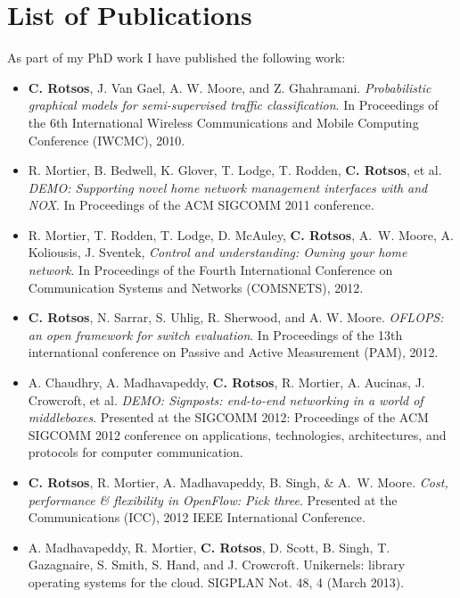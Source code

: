 
\chapter*{List of Publications} \label{sec:intro:pubs}
As part of my PhD work I have published the following work:
\begin{itemize}
  \item \textbf{C. Rotsos}, J. Van Gael, A. W. Moore, and Z.  Ghahramani.
        \textit{Probabilistic graphical models for semi-supervised traffic
          classification}. In Proceedings of the 6th International Wireless
        Communications and Mobile Computing Conference (IWCMC), 2010.

  \item R. Mortier, B. Bedwell, K. Glover, T. Lodge, T. Rodden, \textbf{C.
        Rotsos}, et al. \textit{DEMO: Supporting novel home network management
        interfaces with \of and NOX}. In Proceedings of the ACM SIGCOMM
      2011 conference.

  \item R. Mortier, T. Rodden, T. Lodge, D. McAuley, \textbf{C. Rotsos}, A.~W.
        Moore, A. Koliousis, J. Sventek, \textit{Control and understanding:
          Owning your home network}. In Proceedings of the Fourth International
        Conference on Communication Systems and Networks (COMSNETS), 2012. 

  \item \textbf{C. Rotsos}, N. Sarrar, S. Uhlig, R. Sherwood,
      and A. W. Moore. \textit{OFLOPS: an open framework for \of
          switch evaluation}. In Proceedings of the 13th international
      conference on Passive and Active Measurement (PAM), 2012. 

  \item A. Chaudhry, A. Madhavapeddy, \textbf{C. Rotsos}, R. Mortier,
        A. Aucinas, J. Crowcroft, et al. \textit{DEMO: Signposts:
          end-to-end networking in a world of middleboxes}. Presented at
        the SIGCOMM 2012: Proceedings of the ACM SIGCOMM 2012 conference
        on applications, technologies, architectures, and protocols for
        computer communication.

  \item \textbf{C. Rotsos}, R. Mortier, A. Madhavapeddy, B. Singh, \& A.~W.
        Moore.  \textit{Cost, performance \& flexibility in OpenFlow: Pick
          three}. Presented at the Communications (ICC), 2012 IEEE International
        Conference. 

  \item A. Madhavapeddy, R. Mortier, \textbf{C. Rotsos}, D. Scott, B. Singh, T.
        Gazagnaire, S. Smith, S. Hand, and J.  Crowcroft. Unikernels: library
        operating systems for the cloud.  SIGPLAN Not. 48, 4 (March 2013). 
\end{itemize}
